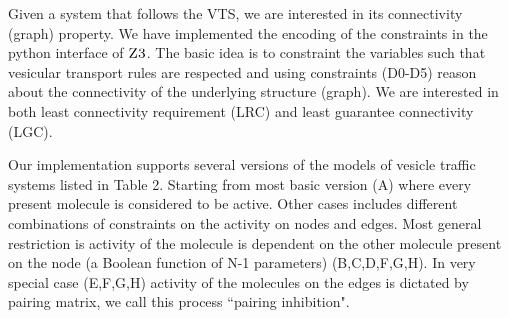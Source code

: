 Given a system that follows the VTS, we are interested in its connectivity (graph) property. We have implemented the encoding of the constraints in the python interface of $\textsc{Z3}$. The basic idea is to constraint the variables such that vesicular transport rules are respected and using constraints (D0-D5) reason about the connectivity of the underlying structure (graph). We are interested in both least connectivity requirement (LRC) and least guarantee connectivity (LGC).


%
Our implementation supports several versions of the models of vesicle traffic systems listed in Table 2. Starting from most basic version (A) where every present molecule is considered to be active. Other cases includes different combinations of constraints on the activity on nodes and edges. Most general restriction is activity of the molecule is dependent on the other molecule present on the node (a Boolean function of N-1 parameters) (B,C,D,F,G,H). In very special case (E,F,G,H) activity of the molecules on the edges is dictated by pairing matrix, we call this process ``pairing inhibition".


